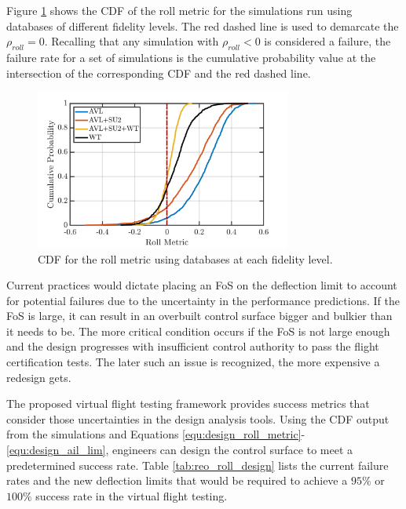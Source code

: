 Figure \ref{fig:reo_roll_all} shows the CDF of the roll metric for the simulations run using databases of different fidelity levels.
The red dashed line is used to demarcate the $\rho_{roll} = 0$.
Recalling that any simulation with $\rho_{roll} < 0$ is considered a failure, the failure rate for a set of simulations is the cumulative probability value at the intersection of the corresponding CDF and the red dashed line.

\begin{figure}
    \center
    \includegraphics[width=0.75\textwidth]{code/image_gen/cba/Stanford_CFR25_147d_2_R2/images/reo_roll_1f_wt.png}
    \caption{CDF for the roll metric using databases at each fidelity level. \label{fig:reo_roll_all}}
\end{figure}

Current practices would dictate placing an FoS on the deflection limit to account for potential failures due to the uncertainty in the performance predictions.
If the FoS is large, it can result in an overbuilt control surface bigger and bulkier than it needs to be. 
The more critical condition occurs if the FoS is not large enough and the design progresses with insufficient control authority to pass the flight certification tests. 
The later such an issue is recognized, the more expensive a redesign gets. 

The proposed virtual flight testing framework provides success metrics that consider those uncertainties in the design analysis tools. 
Using the CDF output from the simulations and Equations \ref{equ:design_roll_metric}-\ref{equ:design_ail_lim}, engineers can design the control surface to meet a predetermined success rate.
Table \ref{tab:reo_roll_design} lists the current failure rates and the new deflection limits that would be required to achieve a $95\%$ or $100\%$ success rate in the virtual flight testing.

